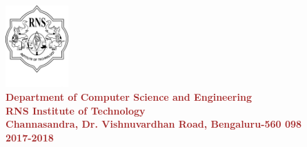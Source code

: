 \begin{titlepage}
\begin{center}
\includegraphics[width=0.18\textwidth]{./RNS_logo.png}\\[0.1in]

\textup{\normalsize {\textcolor{brown}{\bf Department of Computer Science and Engineering} \\ {\textcolor{brown}{\bf \bf{RNS Institute of Technology}}}}}\\
\textup{\small {\textcolor{brown}{\bf Channasandra, Dr. Vishnuvardhan Road, Bengaluru-560 098}\\ \textbf {\textcolor{brown}{2017-2018}}}}




\end{center}
\end{titlepage}
